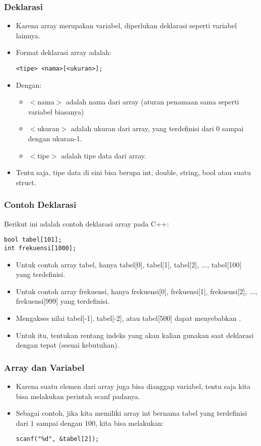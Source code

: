 \begin{frame}[fragile]
\frametitle{Deklarasi}
\begin{itemize}
  \item Karena array merupakan variabel, diperlukan deklarasi seperti variabel lainnya.
  \item Format deklarasi array adalah:
\begin{lstlisting}
<tipe> <nama>[<ukuran>];
\end{lstlisting}
  \item Dengan:
  \begin{itemize}
    \item $<$nama$>$ adalah nama dari array (aturan penamaan sama seperti variabel biasanya)
    \item $<$ukuran$>$ adalah ukuran dari array, yang terdefinisi dari 0 sampai dengan ukuran-1.
    \item $<$tipe$>$ adalah tipe data dari array.
  \end{itemize}
  \item Tentu saja, tipe data di sini bisa berupa int, double, string, bool atau suatu struct.
\end{itemize}
\end{frame}

\begin{frame}[fragile]
\frametitle{Contoh Deklarasi}
Berikut ini adalah contoh deklarasi array pada C++:
\begin{lstlisting}
bool tabel[101];
int frekuensi[1000];
\end{lstlisting}
\begin{itemize}
  \item Untuk contoh array tabel, hanya tabel[0], tabel[1], tabel[2], ..., tabel[100] yang terdefinisi.
  \item Untuk contoh array frekuensi, hanya frekuensi[0], frekuensi[1], frekuensi[2], ..., frekuensi[999] yang terdefinisi.
  \item Mengakses nilai tabel[-1], tabel[-2], atau tabel[500] dapat menyebabkan .
  \item Untuk itu, tentukan rentang indeks yang akan kalian gunakan saat deklarasi dengan tepat (sesuai kebutuhan).
\end{itemize}
\end{frame}

\begin{frame}[fragile]
\frametitle{Array dan Variabel}
\begin{itemize}
  \item Karena suatu elemen dari array juga bisa dianggap variabel, tentu saja kita bisa melakukan perintah scanf padanya.
  \item Sebagai contoh, jika kita memiliki array int bernama tabel yang terdefinisi dari 1 sampai dengan 100, kita bisa melakukan:
\begin{lstlisting}
scanf("%d", &tabel[2]);
\end{lstlisting}
\end{itemize}
\end{frame}

